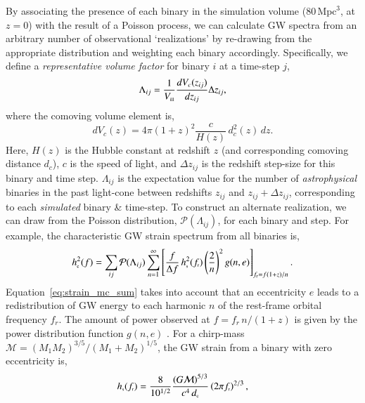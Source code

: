 \documentclass[useAMS, usenatbib]{mnras}  %
\newcommand{\frest}{f_\trt{r}}
\newcommand{\fobs}{f}
\newcommand{\hc}{h_\trt{c}}
\newcommand{\hs}{h_\trt{s}}
\newcommand{\volfactor}{\Lambda_{ij}}
\newcommand{\poisson}{\mathcal{P}}
\newcommand{\mchirp}{\mathcal{M}}     %
\newcommand{\volill}{V_\trt{ill}}   %
\begin{document}
        By associating the presence of each binary in the simulation volume ($80 \, \mathrm{Mpc}^3$, at $z = 0$) with the result of a Poisson process, we can calculate GW spectra from an arbitrary number of observational `realizations' by re-drawing from the appropriate distribution and weighting each binary accordingly.  Specifically, we define a \textit{representative volume factor} for binary $i$ at a time-step $j$,
        \begin{equation}
    	\volfactor = \frac{1}{\volill}\frac{dV_c(z_{ij})}{dz_{ij}} \Delta z_{ij},
    	\end{equation}
        where the comoving volume element is,
        \begin{equation}
    	dV_c(z) = 4\pi \left(1+z\right)^2 \frac{c}{H(z)} \, d^2_c(z) \, dz.
    	\end{equation}
        Here, $H(z)$ is the Hubble constant at redshift $z$ (and corresponding comoving distance $d_c$), $c$ is the speed of light, and $\Delta z_{ij}$ is the redshift step-size for this binary and time step.  $\volfactor$ is the expectation value for the number of \textit{astrophysical} binaries in the past light-cone between redshifts $z_{ij}$ and $z_{ij} + \Delta z_{ij}$, corresponding to each \textit{simulated} binary \& time-step.  To construct an alternate realization, we can draw from the Poisson distribution, $\poisson(\volfactor)$, for each binary and step.  For example, the characteristic GW strain spectrum from all binaries is,
        \begin{equation}
        \label{eq:strain_mc_sum}
        \hc^2(f) = \sum_{ij} \poisson(\volfactor) \sum_{n=1}^\infty \left[ \frac{f}{\Delta f} \, \hs^2(\frest) \left(\frac{2}{n}\right)^2 g(n,e) \right]_{\frest = \fobs(1+z)/n}.
        \end{equation}
        Equation~\ref{eq:strain_mc_sum} takes into account that an eccentricity $e$ leads to a redistribution of GW energy to each harmonic $n$ of the rest-frame orbital frequency $f_r$.  The amount of power observed at $f = f_r \, n / (1+z)$ is given by the power distribution function $g(n,e)$ \citep[see, Eqs.~A1 in][]{paper2}.  For a chirp-mass $\mchirp = \left(M_1 M_2\right)^{3/5} / \left(M_1 + M_2\right)^{1/5}$, the GW strain from a binary with zero eccentricity is,
        \begin{equation}
        \label{eq:source_strain}
        \hs(\frest) = \frac{8}{10^{1/2}} \frac{\left(G\mchirp\right)^{5/3}}{c^4 \, \comdist}
            \left(2 \pi \frest\right)^{2/3},
        \end{equation}
\end{document}
